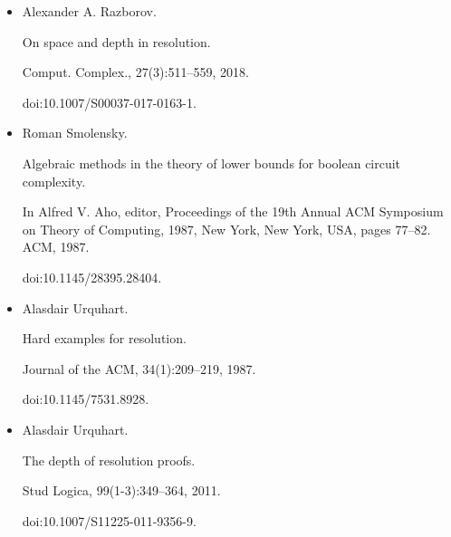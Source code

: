 \documentclass[10pt,a4paper]{article}
\begin{document}
\begin{itemize}
\item 
[31]

Alexander A. Razborov.


On space and depth in resolution.


Comput. Complex., 27(3):511–559, 2018.


doi:10.1007/S00037-017-0163-1.





\item 
[32]

Roman Smolensky.


Algebraic methods in the theory of lower bounds for boolean circuit
complexity.


In Alfred V. Aho, editor, Proceedings of the 19th Annual ACM
Symposium on Theory of Computing, 1987, New York, New York, USA, pages
77–82. ACM, 1987.


doi:10.1145/28395.28404.





\item 
[33]

Alasdair Urquhart.


Hard examples for resolution.


Journal of the ACM, 34(1):209–219, 1987.


doi:10.1145/7531.8928.





\item 
[34]

Alasdair Urquhart.


The depth of resolution proofs.


Stud Logica, 99(1-3):349–364, 2011.


doi:10.1007/S11225-011-9356-9.





\end{itemize}
\end{document}
